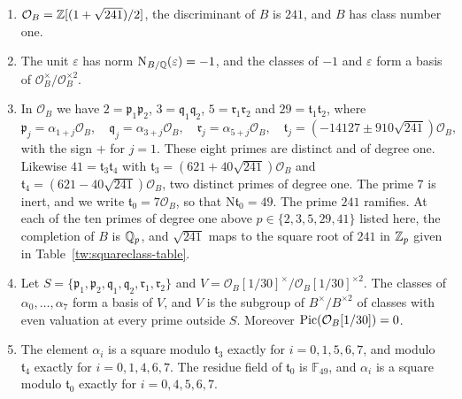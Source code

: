 \begin{lemma}\label{tw:base}
\begin{enumerate}
\item[(a)] $\mathcal O_B=\mathbb Z[(1+\sqrt{241})/2]$, the discriminant of $B$ is
 $241$, and $B$ has class number one.
\item[(b)] The unit $\varepsilon$ has norm $\mathrm N_{B/\mathbb Q}(\varepsilon)=-1$, and the
 classes of $-1$ and $\varepsilon$ form a basis of
 $\mathcal O_B^\times/\mathcal O_B^{\times2}$.
\item[(c)] In $\mathcal O_B$ we have $2=\mathfrak p_1\mathfrak p_2$,
 $3=\mathfrak q_1\mathfrak q_2$, $5=\mathfrak r_1\mathfrak r_2$ and
 $29=\mathfrak t_1\mathfrak t_2$, where
 \[
  \mathfrak p_j=\alpha_{1+j}\mathcal O_B,\quad
  \mathfrak q_j=\alpha_{3+j}\mathcal O_B,\quad
  \mathfrak r_j=\alpha_{5+j}\mathcal O_B,\quad
  \mathfrak t_j=(-14127\pm910\sqrt{241})\mathcal O_B,
 \]
 with the sign $+$ for $j=1$. These eight primes are distinct and of degree
 one. Likewise $41=\mathfrak t_3\mathfrak t_4$ with
 $\mathfrak t_3=(621+40\sqrt{241})\mathcal O_B$ and
 $\mathfrak t_4=(621-40\sqrt{241})\mathcal O_B$, two distinct primes of degree
 one. The prime $7$ is inert, and we write $\mathfrak t_0=7\mathcal O_B$, so
 that $\mathrm N\mathfrak t_0=49$. The prime $241$ ramifies. At each of the ten
 primes of degree one above $p\in\{2,3,5,29,41\}$ listed here, the completion
 of $B$ is $\mathbb Q_p$, and $\sqrt{241}$ maps to the square root of $241$ in $\mathbb Z_p$
 given in Table~\ref{tw:squareclass-table}.
\item[(d)] Let $S=\{\mathfrak p_1,\mathfrak p_2,\mathfrak q_1,\mathfrak q_2,\mathfrak r_1,\mathfrak r_2\}$
 and $V=\mathcal O_B[1/30]^\times/\mathcal O_B[1/30]^{\times2}$. The classes
 of $\alpha_0,\dots,\alpha_7$ form a basis of $V$, and $V$ is the subgroup of
 $B^\times/B^{\times2}$ of classes with even valuation at every prime outside
 $S$. Moreover $\operatorname{Pic}(\mathcal O_B[1/30])=0$.
\item[(e)] The element $\alpha_i$ is a square modulo $\mathfrak t_3$ exactly
 for $i=0,1,5,6,7$, and modulo $\mathfrak t_4$ exactly for $i=0,1,4,6,7$.
 The residue field of $\mathfrak t_0$ is $\mathbb F_{49}$, and $\alpha_i$ is a
 square modulo $\mathfrak t_0$ exactly for $i=0,4,5,6,7$.
\end{enumerate}
\end{lemma}

